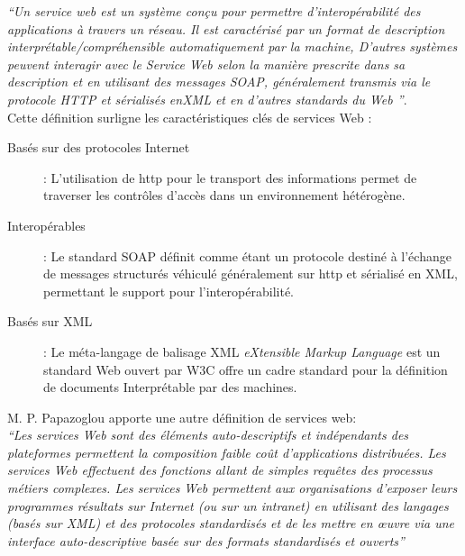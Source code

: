     \emph{``Un service web est un système conçu pour permettre
      d'interopérabilité des applications à travers un réseau.  Il est
      caractérisé par un format de description
      interprétable/compréhensible automatiquement par la machine,
      D'autres systèmes peuvent interagir avec le Service Web selon la
      manière prescrite dans sa description et en utilisant des messages
      SOAP, généralement transmis via
      le protocole HTTP et sérialisés enXML et en d'autres standards du Web ''}.\\

    Cette définition surligne les caractéristiques clés de services Web
    \cite{fremantle2002enterprise}:

    \SpecialItem
    \begin{description} %
    \item[Basés sur des protocoles Internet] : L'utilisation de
      \acrshort{http} pour le transport des informations permet de
      traverser les contrôles d'accès dans un environnement hétérogène.
  
    \item[Interopérables] : Le standard \textsc{SOAP} \cite{box2000simple}
      définit comme étant un protocole destiné à l'échange de messages
      structurés véhiculé généralement sur \acrshort{http} et sérialisé en
      \textsc{XML}, permettant le support pour l'interopérabilité.
      
    \item[Basés sur XML] : Le méta-langage de balisage \textsc{XML}
      \textit{eXtensible Markup Language} est un standard Web ouvert par
      \textsc{W3C} \cite{bray1998extensible} offre un cadre standard pour
      la définition de documents Interprétable par des machines.
    \end{description}
    
    M. P. Papazoglou \cite{papazoglou2003service} apporte une autre définition de services web:\\
    \emph{``Les services Web sont des éléments auto-descriptifs et
      indépendants des plateformes permettent la composition faible coût
      d’applications distribuées. Les services Web effectuent des
      fonctions allant de simples requêtes des processus métiers
      complexes. Les services Web permettent aux organisations d’exposer
      leurs programmes résultats sur Internet (ou sur un intranet) en
      utilisant des langages (basés sur XML) et des protocoles
      standardisés et de les mettre en œuvre via une interface
      auto-descriptive basée sur des formats standardisés et ouverts''}
    
